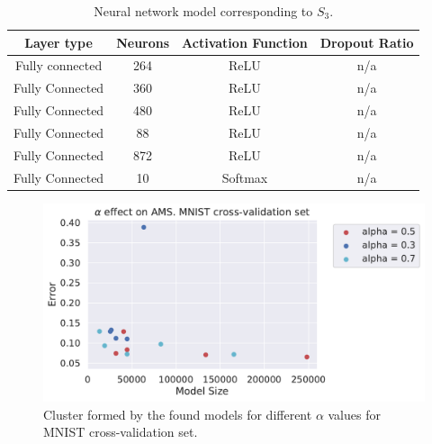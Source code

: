 \documentclass[12pt]{elsart}%
\begin{document}
\begin{table}[!htb]
\begin{center}
\caption{Neural network model corresponding to $S_3$.}
\label{table:neural_network_model_S3}
\vspace{12pt}
\begin{tabular}{| c | c | c | c |}
\hline
Layer type & Neurons & Activation Function & Dropout Ratio \\
\hline
Fully connected & 264 & ReLU & n/a \\
Fully Connected & 360 & ReLU & n/a\\
Fully Connected & 480 & ReLU & n/a\\
Fully Connected & 88 & ReLU & n/a\\
Fully Connected & 872 & ReLU & n/a\\
Fully Connected & 10 & Softmax & n/a\\
\hline
\end{tabular}
\end{center}
\end{table}

\pagebreak

\begin{figure}[!h]
\centering
\includegraphics[scale=0.7]{Figures/alpha_mnist_cvset.pdf}
\caption{Cluster formed by the found models for different $\alpha$ values for MNIST cross-validation set.}
\label{fig:alpha_mnist_cluster_cvset}
\end{figure}
\end{document}

